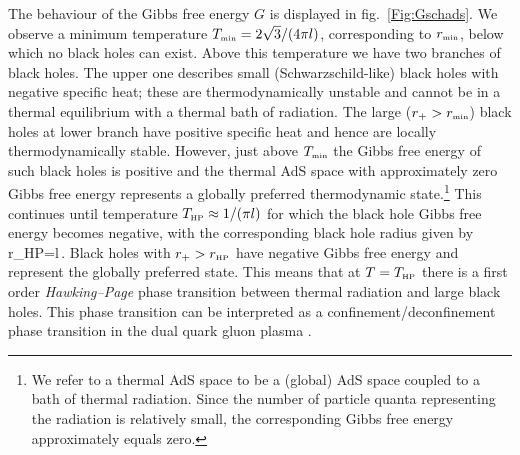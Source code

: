 The behaviour of the Gibbs free energy $G$ is displayed in fig.~\ref{Fig:Gschads}.
We observe a minimum temperature $T_{\mbox{\tiny  \tiny min}}=2\sqrt{3}/(4\pi l)$, corresponding to $r_{\mbox{\tiny  min}}$, below which no black holes can exist. Above this temperature we have two branches of black holes. The upper one describes small (Schwarzschild-like) black holes with negative specific heat; these are thermodynamically unstable and  cannot be in a thermal equilibrium with a thermal bath of radiation. The large ($r_+>r_{\mbox{\tiny  \tiny min}}$) black holes at lower branch have positive specific heat and hence are locally thermodynamically stable. However, just above $T_{\mbox{\tiny  \tiny min}}$ the Gibbs free energy of such black holes is positive and the thermal AdS space with approximately zero Gibbs free energy represents a globally preferred thermodynamic state.\footnote{We refer to a thermal AdS space to be a (global) AdS space coupled to a bath of thermal radiation. Since the number of particle quanta representing the radiation is relatively small, the corresponding Gibbs free energy approximately equals zero.}     
This continues until temperature $T_{\mbox{\tiny  HP}}\approx 1/(\pi l)$ for which the black hole Gibbs free energy becomes negative, with the corresponding black hole radius given by 
\be
r_{\mbox{\tiny  HP}}=l\,.
\ee
Black holes with $r_+> r_{\mbox{\tiny  HP}}$ have negative Gibbs free energy and represent the globally preferred state. 
This means that at $T=T_{\mbox{\tiny  HP}}$ there is a first order {\em Hawking--Page} \cite{HawkingPage:1983} phase transition between thermal radiation and large black holes. This phase transition 
can be interpreted as a confinement/deconfinement phase transition in the dual quark
gluon plasma \cite{Witten:1998b}. 



